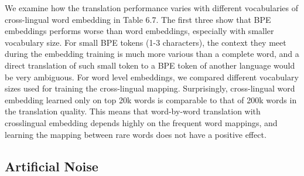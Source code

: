 We examine how the translation performance varies with different vocabularies of cross-lingual word embedding in Table 6.7. The first three show that BPE embeddings performs worse than word embeddings, especially with smaller vocabulary size. For small BPE tokens (1-3 characters),
the context they meet during the embedding
training is much more various than a complete word, and a direct translation of such small
token to a BPE token of another language would be very ambiguous. For word level embeddings, we compared different vocabulary sizes used for training the
cross-lingual mapping. Surprisingly, cross-lingual word embedding learned only on top 20k words is comparable to that of 200k words in the translation quality. This means that word-by-word translation with crosslingual embedding depends highly on the frequent word mappings, and learning the mapping between rare words does not have a positive effect. 

\subsection{Artificial Noise}

